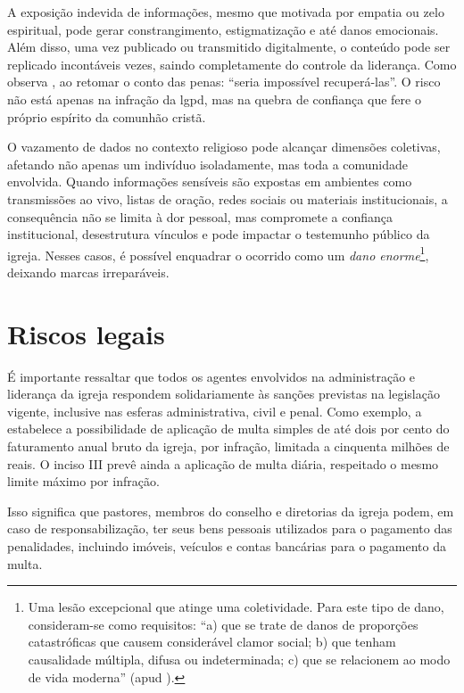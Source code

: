 A exposição indevida de informações, mesmo que motivada por empatia ou zelo espiritual, pode gerar constrangimento, estigmatização e até danos emocionais. Além disso, uma vez publicado ou transmitido digitalmente, o conteúdo pode ser replicado incontáveis vezes, saindo completamente do controle da liderança. Como observa , ao retomar o conto das penas: ``seria impossível recuperá-las''. O risco não está apenas na infração da \gls{lgpd}, mas na quebra de confiança que fere o próprio espírito da comunhão cristã.

O vazamento de dados no contexto religioso pode alcançar dimensões coletivas, afetando não apenas um indivíduo isoladamente, mas toda a comunidade envolvida. Quando informações sensíveis são expostas em ambientes como transmissões ao vivo, listas de oração, redes sociais ou materiais institucionais, a consequência não se limita à dor pessoal, mas compromete a confiança institucional, desestrutura vínculos e pode impactar o testemunho público da igreja. Nesses casos, é possível enquadrar o ocorrido como um \textit{dano enorme}\footnote{Uma lesão excepcional que atinge uma coletividade. Para este tipo de dano, consideram-se como requisitos: ``a) que se trate de danos de proporções catastróficas que causem considerável clamor social; b) que tenham causalidade múltipla, difusa ou indeterminada; c) que se relacionem ao modo de vida moderna'' (apud ).}, deixando marcas irreparáveis.

\section{Riscos legais}

É importante ressaltar que todos os agentes envolvidos na administração e liderança da igreja respondem solidariamente às sanções previstas na legislação vigente, inclusive nas esferas administrativa, civil e penal. Como exemplo, a  estabelece a possibilidade de aplicação de multa simples de até dois por cento do faturamento anual bruto da igreja, por infração, limitada a cinquenta milhões de reais. O inciso III prevê ainda a aplicação de multa diária, respeitado o mesmo limite máximo por infração.

Isso significa que pastores, membros do conselho e diretorias da igreja podem, em caso de responsabilização, ter seus bens pessoais utilizados para o pagamento das penalidades, incluindo imóveis, veículos e contas bancárias para o pagamento da multa.

